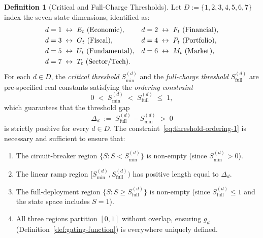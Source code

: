 \documentclass[12pt,openany]{book}
\newcommand{\calE}{\mathcal{E}}
\newcommand{\calF}{\mathcal{F}}
\newcommand{\calG}{\mathcal{G}}
\newcommand{\calP}{\mathcal{P}}
\newcommand{\calU}{\mathcal{U}}
\newcommand{\calM}{\mathcal{M}}
\newcommand{\calT}{\mathcal{T}}
\numberwithin{equation}{chapter}
\theoremstyle{plain}
\theoremstyle{definition}
\newtheorem{definition}[theorem]{Definition}
\theoremstyle{remark}
\def\mathcal#1{#1}%
\begin{document}
\begin{definition}[Critical and Full-Charge Thresholds]
\label{def:thresholds}
Let $\mathcal{D} := \{1,2,3,4,5,6,7\}$ index the seven state
dimensions, identified as:
\begin{align}
  d=1 &\;\leftrightarrow\; \calE_t \text{ (Economic)}, &
  d=2 &\;\leftrightarrow\; \calF_t \text{ (Financial)}, \notag\\
  d=3 &\;\leftrightarrow\; \calG_t \text{ (Fiscal)}, &
  d=4 &\;\leftrightarrow\; \calP_t \text{ (Portfolio)}, \notag\\
  d=5 &\;\leftrightarrow\; \calU_t \text{ (Fundamental)}, &
  d=6 &\;\leftrightarrow\; \calM_t \text{ (Market)}, \notag\\
  d=7 &\;\leftrightarrow\; \calT_t \text{ (Sector/Tech)}.&& \notag
\end{align}
For each $d \in \mathcal{D}$, the
\emph{critical threshold} $\mathcal{S}_{\min}^{(d)}$ and the
\emph{full-charge threshold} $\mathcal{S}_{\mathrm{full}}^{(d)}$
are pre-specified real constants satisfying the
\emph{ordering constraint}
\begin{equation}
  0 \;<\; \mathcal{S}_{\min}^{(d)}
    \;<\; \mathcal{S}_{\mathrm{full}}^{(d)}
    \;\leq\; 1,
  \label{eq:threshold-ordering-1}
\end{equation}
which guarantees that the threshold gap
\begin{equation}
  \Delta_d \;:=\;
    \mathcal{S}_{\mathrm{full}}^{(d)} - \mathcal{S}_{\min}^{(d)} \;>\; 0
  \label{eq:threshold-gap}
\end{equation}
is strictly positive for every $d \in \mathcal{D}$.  The
constraint~\eqref{eq:threshold-ordering-1} is necessary and
sufficient to ensure that:
\begin{enumerate}
  \item The circuit-breaker region
        $\{\mathcal{S} : \mathcal{S} < \mathcal{S}_{\min}^{(d)}\}$
        is non-empty (since $\mathcal{S}_{\min}^{(d)} > 0$).
  \item The linear ramp region
        $[\mathcal{S}_{\min}^{(d)}, \mathcal{S}_{\mathrm{full}}^{(d)})$
        has positive length equal to $\Delta_d$.
  \item The full-deployment region
        $\{\mathcal{S} : \mathcal{S} \geq
        \mathcal{S}_{\mathrm{full}}^{(d)}\}$ is non-empty
        (since $\mathcal{S}_{\mathrm{full}}^{(d)} \leq 1$ and the
        state space includes $\mathcal{S} = 1$).
  \item All three regions partition $[0,1]$ without overlap,
        ensuring $g_d$ (Definition~\ref{def:gating-function})
        is everywhere uniquely defined.
\end{enumerate}


\end{definition}
\end{document}
